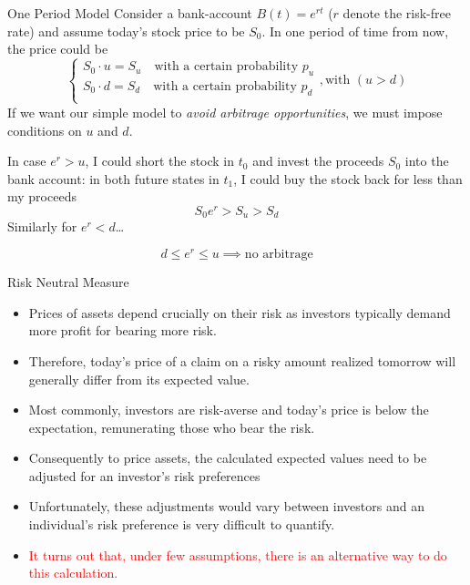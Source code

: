 \documentclass{beamer}
\begin{document}
\begin{frame}{One Period Model}
Consider a bank-account $B(t)=e^{rt}$ ($r$ denote the risk-free rate) and assume today's stock price to be $S_0$. In one period of time from now, the price could be 
\begin{equation*}
	\begin{cases}
		S_0\cdot u = S_u \quad\text{with a certain probability $p_u$} \\
		S_0\cdot d = S_d \quad\text{with a certain probability $p_d$}\\ 
	\end{cases}, \text{with }(u > d)
\end{equation*}
If we want our simple model to \emph{avoid arbitrage opportunities}, we must impose conditions on $u$ and $d$.

In case $e^r > u$, I could short the stock in $t_0$ and invest the proceeds $S_0$ into the bank account: in both future states in $t_1$, I could buy the stock back for less than my proceeds 
\begin{equation*}
S_0e^r > S_u > S_d
\end{equation*} Similarly for $e^r < d$\ldots

\begin{equation*}
	\boxed{d\le e^r \le u \implies \text{no arbitrage}}
\end{equation*}
\end{frame}

\begin{frame}{Risk Neutral Measure}
	\begin{itemize}
		\item Prices of assets depend crucially on their risk as investors typically demand more profit for bearing more risk.
		\item Therefore, today's price of a claim on a risky amount realized tomorrow will generally differ from its expected value.
		\item Most commonly, investors are risk-averse and today's price is below the expectation, remunerating those who bear the risk.
		\item Consequently to price assets, the calculated expected values need to be adjusted for an investor's risk preferences
		\item Unfortunately, these adjustments would vary between investors and an individual's risk preference is very difficult to quantify.
		\item \textcolor{red}{It turns out that, under few assumptions, there is an alternative way to do this calculation.}
	\end{itemize}
\end{frame}
\end{document}
